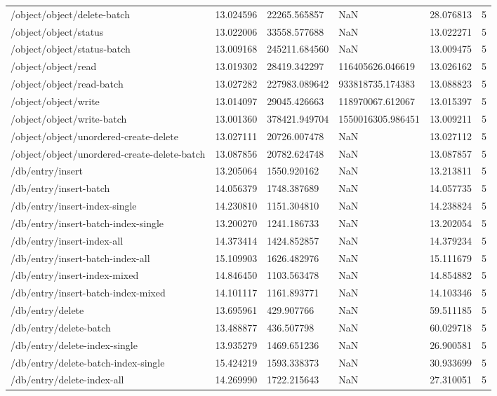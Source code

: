 \begin{tabularx}{\linewidth}{XXXXXX}
/object/object/delete-batch & 13.024596 & 22265.565857 & NaN & 28.076813 & 5 \\
/object/object/status & 13.022006 & 33558.577688 & NaN & 13.022271 & 5 \\
/object/object/status-batch & 13.009168 & 245211.684560 & NaN & 13.009475 & 5 \\
/object/object/read & 13.019302 & 28419.342297 & 116405626.046619 & 13.026162 & 5 \\
/object/object/read-batch & 13.027282 & 227983.089642 & 933818735.174383 & 13.088823 & 5 \\
/object/object/write & 13.014097 & 29045.426663 & 118970067.612067 & 13.015397 & 5 \\
/object/object/write-batch & 13.001360 & 378421.949704 & 1550016305.986451 & 13.009211 & 5 \\
/object/object/unordered-create-delete & 13.027111 & 20726.007478 & NaN & 13.027112 & 5 \\
/object/object/unordered-create-delete-batch & 13.087856 & 20782.624748 & NaN & 13.087857 & 5 \\
/db/entry/insert & 13.205064 & 1550.920162 & NaN & 13.213811 & 5 \\
/db/entry/insert-batch & 14.056379 & 1748.387689 & NaN & 14.057735 & 5 \\
/db/entry/insert-index-single & 14.230810 & 1151.304810 & NaN & 14.238824 & 5 \\
/db/entry/insert-batch-index-single & 13.200270 & 1241.186733 & NaN & 13.202054 & 5 \\
/db/entry/insert-index-all & 14.373414 & 1424.852857 & NaN & 14.379234 & 5 \\
/db/entry/insert-batch-index-all & 15.109903 & 1626.482976 & NaN & 15.111679 & 5 \\
/db/entry/insert-index-mixed & 14.846450 & 1103.563478 & NaN & 14.854882 & 5 \\
/db/entry/insert-batch-index-mixed & 14.101117 & 1161.893771 & NaN & 14.103346 & 5 \\
/db/entry/delete & 13.695961 & 429.907766 & NaN & 59.511185 & 5 \\
/db/entry/delete-batch & 13.488877 & 436.507798 & NaN & 60.029718 & 5 \\
/db/entry/delete-index-single & 13.935279 & 1469.651236 & NaN & 26.900581 & 5 \\
/db/entry/delete-batch-index-single & 15.424219 & 1593.338373 & NaN & 30.933699 & 5 \\
/db/entry/delete-index-all & 14.269990 & 1722.215643 & NaN & 27.310051 & 5 \\

\end{tabularx}
